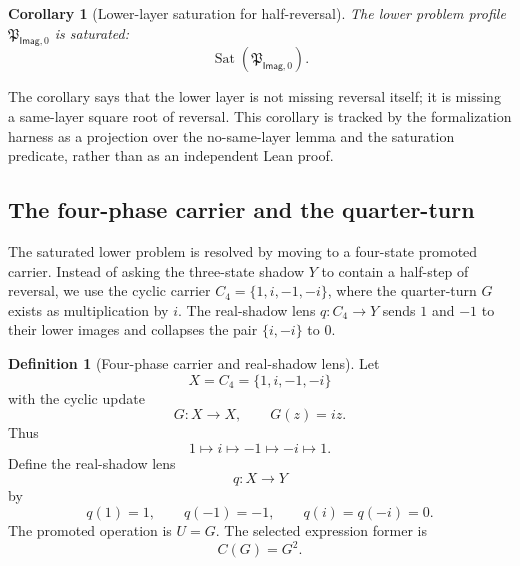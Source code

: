\documentclass[11pt]{article}
\newcommand{\Imag}{\mathsf{Imag}}
\newtheorem{corollary}[theorem]{Corollary}
\theoremstyle{definition}
\newtheorem{definition}[theorem]{Definition}
\begin{document}
\begin{corollary}[Lower-layer saturation for half-reversal]
\label{cor:imag-lower-saturation}
The lower problem profile \(\mathfrak P_{\Imag,0}\) is saturated:
\[
\operatorname{Sat}(\mathfrak P_{\Imag,0}).
\]
\end{corollary}

The corollary says that the lower layer is not missing reversal itself; it is
missing a same-layer square root of reversal.  This corollary is tracked by
the formalization harness as a projection over the no-same-layer lemma and
the saturation predicate, rather than as an independent Lean proof.

\subsection{The four-phase carrier and the quarter-turn}
\label{subsec:imag-four-phase-carrier}

The saturated lower problem is resolved by moving to a four-state promoted
carrier.  Instead of asking the three-state shadow \(Y\) to contain a half-step
of reversal, we use the cyclic carrier \(C_4=\{1,i,-1,-i\}\), where the
quarter-turn \(G\) exists as multiplication by \(i\).  The real-shadow lens
\(q:C_4\to Y\) sends \(1\) and \(-1\) to their lower images and collapses the
pair \(\{i,-i\}\) to \(0\).

\begin{definition}[Four-phase carrier and real-shadow lens]
\label{def:imag-four-phase-carrier}
Let
\[
X=C_4=\{1,i,-1,-i\}
\]
with the cyclic update
\[
G:X\to X,
\qquad
G(z)=iz.
\]
Thus
\[
1\mapsto i\mapsto -1\mapsto -i\mapsto 1.
\]
Define the real-shadow lens
\[
q:X\to Y
\]
by
\[
q(1)=1,
\qquad
q(-1)=-1,
\qquad
q(i)=q(-i)=0.
\]
The promoted operation is \(U=G\).  The selected expression former is
\[
C(G)=G^2.
\]
\end{definition}
\end{document}
